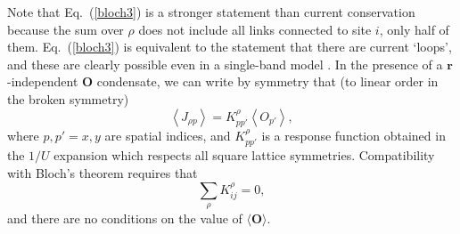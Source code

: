 \documentclass[aps,prb,preprint,onecolumn,citeautoscript,superscriptaddress,footinbib,
eqsecnum]{revtex4-1}
\newcommand{\beq}{\begin{equation}}
\newcommand{\eeq}{\end{equation}}
\begin{document}
Note that Eq.~(\ref{bloch3}) is a stronger statement than current conservation because the sum over
$\rho$ does not include all links connected to site $i$, only half of them.
Eq.~(\ref{bloch3}) is equivalent to the statement that there are current `loops', and these
are clearly possible even in a single-band model \cite{2004PhRvB..69x5104S,2008PhRvL.100b7003B}. 
In the presence of a ${\bm r}$-independent ${\bm O}$ condensate, we can write by symmetry that (to linear
order in the broken symmetry)
\beq
\left\langle J_{\rho p} \right\rangle  = K^\rho_{pp'} \left \langle O_{p'} \right\rangle, \label{JKO}
\eeq
where $p,p'=x,y$ are spatial indices, and $K_{pp'}^\rho$ is a response function 
obtained in the $1/U$ expansion which respects
all square lattice symmetries. Compatibility with Bloch's theorem requires that
\beq
\sum_\rho K_{ij}^\rho  = 0, \label{bloch2}
\eeq
and there are no conditions on the value of $\langle {\bm O} \rangle$.
\end{document}
